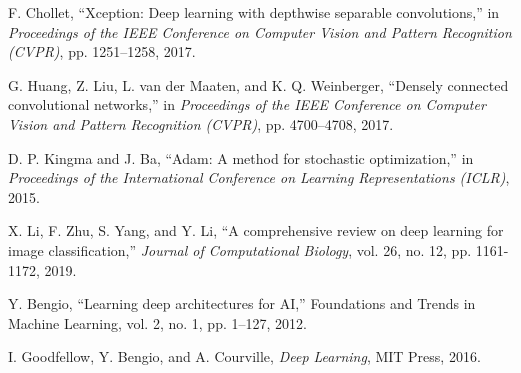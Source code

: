 \begin{thebibliography}{99}
 F. Chollet, ``Xception: Deep learning with depthwise separable convolutions,'' in \textit{Proceedings of the IEEE Conference on Computer Vision and Pattern Recognition (CVPR)}, pp. 1251–1258, 2017.

 G. Huang, Z. Liu, L. van der Maaten, and K. Q. Weinberger, ``Densely connected convolutional networks,'' in \textit{Proceedings of the IEEE Conference on Computer Vision and Pattern Recognition (CVPR)}, pp. 4700–4708, 2017.

 D. P. Kingma and J. Ba, ``Adam: A method for stochastic optimization,'' in \textit{Proceedings of the International Conference on Learning Representations (ICLR)}, 2015.

 X. Li, F. Zhu, S. Yang, and Y. Li, ``A comprehensive review on deep learning for image classification,'' \textit{Journal of Computational Biology}, vol. 26, no. 12, pp. 1161-1172, 2019.

 Y. Bengio, ``Learning deep architectures for AI,'' Foundations and Trends in Machine Learning, vol. 2, no. 1, pp. 1–127, 2012.

 I. Goodfellow, Y. Bengio, and A. Courville, \textit{Deep Learning}, MIT Press, 2016.

\end{thebibliography}
























